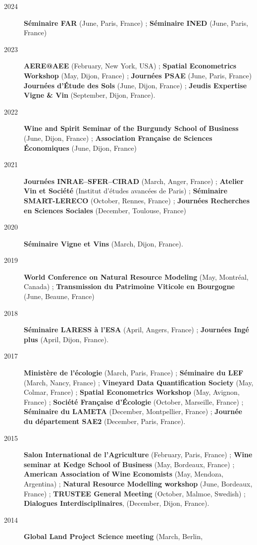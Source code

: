 \documentclass[11pt, a4paper]{./style}
\begin{document}
\begin{description}
\item[{2024}] \textbf{Séminaire FAR} (June, Paris, France) ; \textbf{Séminaire INED}
(June, Paris, France)
\item[{2023}] \textbf{AERE@AEE} (February, New York, USA) ; \textbf{Spatial
Econometrics Workshop} (May, Dijon, France) ; \textbf{Journées PSAE}
(June, Paris, France) \textbf{Journées d'Étude des Sols} (June, Dijon,
France) ; \textbf{Jeudis Expertise Vigne \& Vin} (September, Dijon,
France).
\item[{2022}] \textbf{Wine and Spirit Seminar of the Burgundy School of
Business} (June, Dijon, France) ; \textbf{Association Française de
Sciences Économiques} (June, Dijon, France)
\item[{2021}] \textbf{Journées INRAE--SFER--CIRAD} (March, Anger, France) ;
\textbf{Atelier Vin et Société} (Institut d’études avancées de Paris) ;
\textbf{Séminaire SMART-LERECO} (October, Rennes, France) ; \textbf{Journées
Recherches en Sciences Sociales} (December, Toulouse, France)
\item[{2020}] \textbf{Séminaire Vigne et Vins} (March, Dijon, France).
\item[{2019}] \textbf{World Conference on Natural Resource Modeling} (May,
Montréal, Canada) ; \textbf{Transmission du Patrimoine Viticole en
Bourgogne} (June, Beaune, France)
\item[{2018}] \textbf{Séminaire LARESS à l'ESA} (April, Angers, France) ;
\textbf{Journées Ingé plus} (April, Dijon, France).
\item[{2017}] \textbf{Ministère de l'écologie} (March, Paris, France) ;
\textbf{Séminaire du LEF} (March, Nancy, France) ; \textbf{Vineyard Data
Quantification Society} (May, Colmar, France) ; \textbf{Spatial
Econometrics Workshop} (May, Avignon, France) ; \textbf{Société Française
d'Écologie} (October, Marseille, France) ; \textbf{Séminaire du LAMETA}
(December, Montpellier, France) ; \textbf{Journée du département SAE2}
(December, Paris, France).
\item[{2015}] \textbf{Salon International de l'Agriculture} (February, Paris,
France) ; \textbf{Wine seminar at Kedge School of Business} (May,
Bordeaux, France) ; \textbf{American Association of Wine Economists}
(May, Mendoza, Argentina) ; \textbf{Natural Resource Modelling workshop}
(June, Bordeaux, France) ; \textbf{TRUSTEE General Meeting} (October,
Malmoe, Swedish) ; \textbf{Dialogues Interdisciplinaires}, (December,
Dijon, France).
\item[{2014}] \textbf{Global Land Project Science meeting} (March, Berlin,

\end{description}
\end{document}
